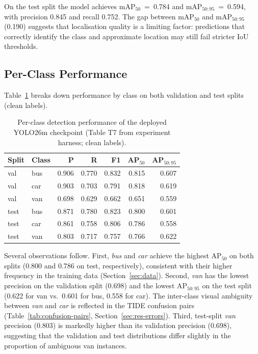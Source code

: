On the test split the model achieves mAP$_{50}$~=~0.784 and
mAP$_{50:95}$~=~0.594, with precision 0.845 and recall 0.752.
The gap between mAP$_{50}$ and mAP$_{50:95}$ (0.190) suggests that
localisation quality is a limiting factor: predictions that correctly
identify the class and approximate location may still fail stricter IoU
thresholds.

\subsection{Per-Class Performance}
\label{sec:res-perclass}

Table~\ref{tab:perclass} breaks down performance by class on both
validation and test splits (clean labels).

\begin{table}[htbp]
\centering
\caption{Per-class detection performance of the deployed YOLO26m checkpoint
  (Table T7 from experiment harness; clean labels).}
\label{tab:perclass}
\begin{tabular}{llrrrrr}
\toprule
Split & Class & P & R & F1 & AP$_{50}$ & AP$_{50:95}$ \\
\midrule
val  & bus & 0.906 & 0.770 & 0.832 & 0.815 & 0.607 \\
val  & car & 0.903 & 0.703 & 0.791 & 0.818 & 0.619 \\
val  & van & 0.698 & 0.629 & 0.662 & 0.651 & 0.559 \\
\midrule
test & bus & 0.871 & 0.780 & 0.823 & 0.800 & 0.601 \\
test & car & 0.861 & 0.758 & 0.806 & 0.786 & 0.558 \\
test & van & 0.803 & 0.717 & 0.757 & 0.766 & 0.622 \\
\bottomrule
\end{tabular}
\end{table}

Several observations follow.
First, \textit{bus} and \textit{car} achieve the highest AP$_{50}$ on
both splits (0.800 and 0.786 on test, respectively), consistent with
their higher frequency in the training data
(Section~\ref{sec:data}).
Second, \textit{van} has the lowest precision on the validation split
(0.698) and the lowest AP$_{50:95}$ on the test split (0.622 for van vs.\
0.601 for bus, 0.558 for car).
The inter-class visual ambiguity between \textit{van} and \textit{car} is
reflected in the TIDE confusion pairs
(Table~\ref{tab:confusion-pairs}, Section~\ref{sec:res-errors}).
Third, test-split \textit{van} precision (0.803) is markedly higher than
its validation precision (0.698), suggesting that the validation and test
distributions differ slightly in the proportion of ambiguous van instances.

